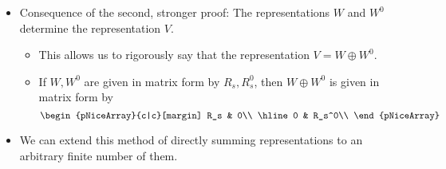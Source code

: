 \documentclass[../notes.tex]{subfiles}
\begin{document}
\begin{itemize}
\begin{theorem}
        \begin{proof}[Proof 2 (orthogonal complement)]
            Let $W^0$ be the orthogonal complement of $W$, and endow $V$ with a \textbf{scalar product} $(x\mid y)$ to turn it into an inner product space. Replace $(x\mid y)$ with the new inner product $\sum_{t\in G}(\rho_tx\mid\rho_ty)$. Now, if it wasn't already, the inner product is invariant under $\rho_s$ for all $s$, i.e., for $s$ arbitrary, we have
            \begin{equation*}
                (\rho_sx\mid\rho_sy) = (x\mid y)
            \end{equation*}
            This means that vectors that were orthogonal before $\rho_s$ is applied to $V$, stay orthogonal after $\rho_s$ is applied to $V$. In particular, since $\rho_s$ preserves $W$ by hypothesis, all vectors orthogonal to $W$ (i.e., all vectors in $W^0$) stay orthogonal to $W$ (i.e., stay in $W^0$) after $\rho_s$ is applied. Thus, $W^0$ is stable under $\rho_s$ as well.
        \end{proof}
    \end{theorem}
    \item Consequence of the second, stronger proof: The representations $W$ and $W^0$ determine the representation $V$.
    \begin{itemize}
        \item This allows us to rigorously say that the representation $V=W\oplus W^0$.
        \item If $W,W^0$ are given in matrix form by $R_s,R_s^0$, then $W\oplus W^0$ is given in matrix form by
        \begin{equation*}
            \begin{pNiceArray}{c|c}[margin]
                R_s & 0\\
                \hline
                0 & R_s^0\\
            \end{pNiceArray}
        \end{equation*}
    \end{itemize}
    \item We can extend this method of directly summing representations to an arbitrary finite number of them.
\end{itemize}
\end{document}
